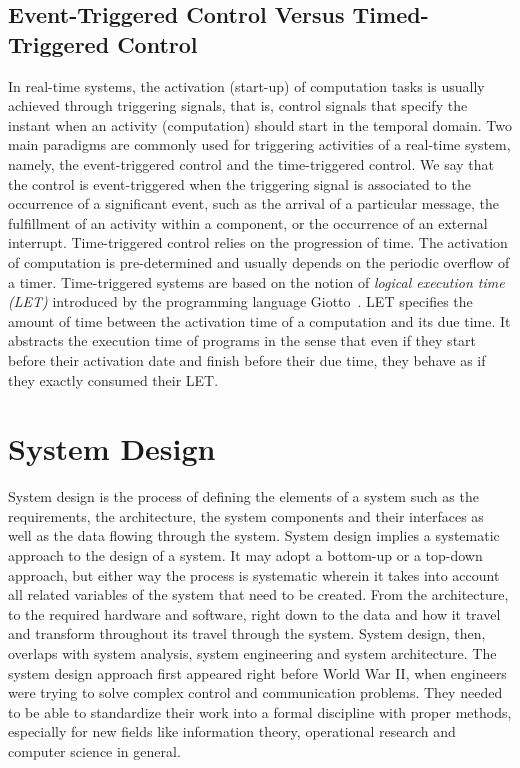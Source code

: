\subsection{Event-Triggered Control Versus Timed-Triggered Control}
In real-time systems, the activation (start-up) of computation tasks is usually achieved through
triggering signals, that is, control signals that specify the instant when an activity 
(computation) should start in the temporal domain.
Two main paradigms are commonly used for triggering activities of a real-time system, namely,
the event-triggered control and the time-triggered control.
We say that the control is event-triggered when the triggering signal is associated to 
the occurrence of a significant event, such as the arrival of a particular message, the 
fulfillment of an activity within a component, or the occurrence of an external interrupt.
Time-triggered control relies on the progression of time. The activation of computation is 
pre-determined and usually depends on the periodic overflow of a timer.
Time-triggered systems are based on the notion of \emph{logical execution time (LET)} 
introduced by the programming language Giotto~\cite{intro:giotto}. LET specifies the amount of 
time between the activation time of a computation and its due time. It abstracts the execution
time of programs in the sense that even if they start before their activation date 
and finish before their due time, they behave as if they exactly consumed their LET.

\section{System Design}
System design is the process of defining the elements of a system such as the requirements, 
the architecture, the system components and their interfaces as well as the data flowing 
through the system.
System design implies a systematic approach to the design of a system. It may adopt a bottom-up 
or a top-down approach, but either way the process is systematic wherein it takes into account 
all
related variables of the system that need to be created. From the architecture, to the required 
hardware and software, right down to the data and how it travel and transform throughout its 
travel through the system. System design, then, overlaps with system analysis, system 
engineering and system architecture.
The system design approach first appeared right before World War II, when engineers were 
trying to solve complex control and communication problems. They needed to be able to 
standardize their work into a formal discipline with proper methods, especially for new fields 
like information theory, operational research and computer science in general.

